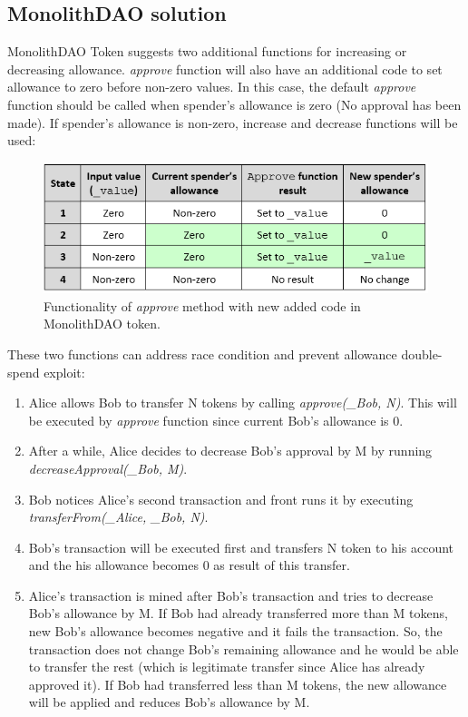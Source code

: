 \subsection{MonolithDAO solution}
MonolithDAO\cite{Ref12} Token suggests two additional functions for increasing or decreasing allowance. \textit{approve} function will also have an additional code to set allowance to zero before non-zero values. In this case, the default \textit{approve} function should be called when spender’s allowance is zero (No approval has been made). If spender’s allowance is non-zero, increase and decrease functions will be used:
\begin{figure}[H]
	\centering
	\includegraphics[width=1.0\linewidth]{figures/multiple_withdrawal_09.png}
	\caption{Functionality of \textit{approve} method with new added code in MonolithDAO token.}
\end{figure}
These two functions can address race condition and prevent allowance double-spend exploit:
\begin{enumerate}
	\item Alice allows Bob to transfer N tokens by calling \textit{approve(\_Bob, N)}. This will be executed by \textit{approve} function since current Bob’s allowance is 0.
	\item After a while, Alice decides to decrease Bob’s approval by M by running \textit{decreaseApproval(\_Bob, M)}.
	\item Bob notices Alice’s second transaction and front runs it by executing \textit{transferFrom(\_Alice, \_Bob, N)}.
	\item Bob’s transaction will be executed first and transfers N token to his account and the his allowance becomes 0 as result of this transfer.
	\item Alice’s transaction is mined after Bob’s transaction and tries to decrease Bob’s allowance by M. If Bob had already transferred more than M tokens, new Bob’s allowance becomes negative and it fails the transaction. So, the transaction does not change Bob’s remaining allowance and he would be able to transfer the rest (which is legitimate transfer since Alice has already approved it). If Bob had transferred less than M tokens, the new allowance will be applied and reduces Bob’s allowance by M.\newline
\end{enumerate}
